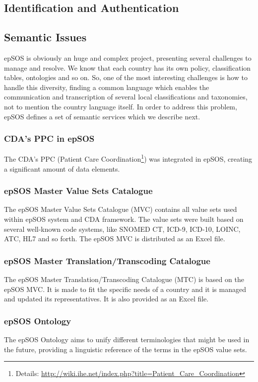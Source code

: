 \subsection{Identification and Authentication}
\subsection{Semantic Issues}
epSOS is obviously an huge and complex project, presenting several challenges to manage and resolve. We know that each country has its own policy, classification tables, ontologies and so on. So, one of the most interesting challenges is how to handle this diversity, finding a common language which enables the communication and transcription of several local classifications and taxonomies, not to mention the country language itself. In order to address this problem, epSOS defines a set of semantic services which we describe next. 

\subsubsection{CDA's PPC in epSOS}
The CDA's PPC (Patient Care Coordination\footnote{Details: \url{http://wiki.ihe.net/index.php?title=Patient_Care_Coordination}}) was integrated in epSOS, creating a significant amount of data elements.

\subsubsection{epSOS Master Value Sets Catalogue}
The epSOS Master Value Sets Catalogue (MVC) contains all value sets used within epSOS system and CDA framework. The value sets were built based on several well-known code systems, like SNOMED CT, ICD-9, ICD-10, LOINC, ATC, HL7 and so forth. The epSOS MVC is distributed as an Excel file.

\subsubsection{epSOS Master Translation/Transcoding Catalogue}
The epSOS Master Translation/Transcoding Catalogue (MTC) is based on the epSOS MVC. It is made to fit the specific needs of a country and it is managed and updated its representatives. It is also provided as an Excel file.

\subsubsection{epSOS Ontology}
The epSOS Ontology aims to unify different terminologies that might be used in the future, providing a linguistic reference of the terms in the epSOS value sets.



